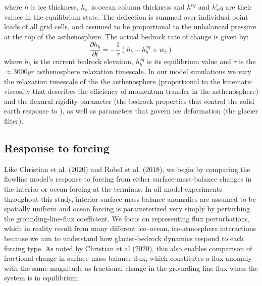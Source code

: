 \documentclass[tc, manuscript]{copernicus}
\begin{document}
where $h$ is ice thickness, $h_w$ is ocean column thickness and $h^{eq}$ and $h_w^eq$ are their values in the equilibrium state. The deflection is summed over individual point loads of all grid cells, and assumed to be proportional to the unbalanced pressure at the top of the asthenosphere. The actual bedrock rate of change is given by:
\begin{equation}
\frac{\partial h_b}{\partial t} = -\frac{1}{\tau} \left(h_b - h_b^{eq} + w_b \right)
\end{equation}
where $h_b$ is the current bedrock elevation, $h_b^{eq}$ is its equilibrium value and $\tau$ is the $\approx 3000yr$ asthenosphere relaxation timescale. In our model simulations we vary the relaxation timescale of the the asthenosphere (proportional to the kinematic viscosity that describes the efficiency of momentum transfer in the asthenosphere) and the flexural rigidity parameter (the bedrock properties that control the solid earth response to ), as well as parameters that govern ice deformation (the glacier filter).

\subsection{Response to forcing}

Like Christian et al. (2020) and Robel et al. (2018), we begin by comparing the flowline model's response to forcing from either surface-mass-balance changes in the interior or ocean forcing at the terminus. In all model experiments throughout this study, interior surface-mass-balance anomalies are assumed to be spatially uniform and ocean forcing is parameterized very simply by perturbing the grounding-line-flux coefficient. We focus on representing flux perturbations, which in reality result from many different ice–ocean, ice-atmosphere interactions because we aim to understand how glacier-bedrock dynamics respond to each forcing type. As noted by Christian et al (2020), this also enables comparison of fractional change in surface mass balance flux, which constitutes a flux anomaly with the same magnitude as fractional change in the grounding line flux when the system is in equilibrium.
\end{document}
